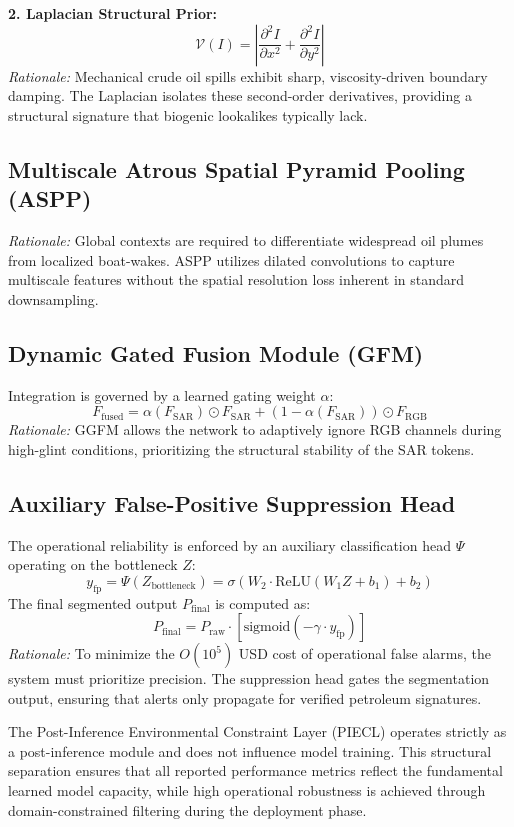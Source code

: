 \textbf{2. Laplacian Structural Prior:}
\begin{equation}
\mathcal{V}(I) = \left| \frac{\partial^2 I}{\partial x^2} + \frac{\partial^2 I}{\partial y^2} \right|
\end{equation}
\textit{Rationale:} Mechanical crude oil spills exhibit sharp, viscosity-driven boundary damping. The Laplacian isolates these second-order derivatives, providing a structural signature that biogenic lookalikes typically lack.

\subsection{Multiscale Atrous Spatial Pyramid Pooling (ASPP)}
\textit{Rationale:} Global contexts are required to differentiate widespread oil plumes from localized boat-wakes. ASPP utilizes dilated convolutions to capture multiscale features without the spatial resolution loss inherent in standard downsampling.

\subsection{Dynamic Gated Fusion Module (GFM)}
Integration is governed by a learned gating weight $\alpha$:
\begin{equation}
F_{\text{fused}} = \alpha(F_{\text{SAR}}) \odot F_{\text{SAR}} + (1 - \alpha(F_{\text{SAR}})) \odot F_{\text{RGB}}
\end{equation}
\textit{Rationale:} GGFM allows the network to adaptively ignore RGB channels during high-glint conditions, prioritizing the structural stability of the SAR tokens.

\subsection{Auxiliary False-Positive Suppression Head}
The operational reliability is enforced by an auxiliary classification head $\Psi$ operating on the bottleneck $Z$:
\begin{equation}
y_{\text{fp}} = \Psi(Z_{\text{bottleneck}}) = \sigma(W_2 \cdot \text{ReLU}(W_1 Z + b_1) + b_2)
\end{equation}
The final segmented output $P_{\text{final}}$ is computed as:
\begin{equation}
P_{\text{final}} = P_{\text{raw}} \cdot [ \text{sigmoid}(-\gamma \cdot y_{\text{fp}}) ]
\end{equation}
\textit{Rationale:} To minimize the $O(10^5)$ USD cost of operational false alarms, the system must prioritize precision. The suppression head gates the segmentation output, ensuring that alerts only propagate for verified petroleum signatures.

The Post-Inference Environmental Constraint Layer (PIECL) operates strictly as a post-inference module and does not influence model training. This structural separation ensures that all reported performance metrics reflect the fundamental learned model capacity, while high operational robustness is achieved through domain-constrained filtering during the deployment phase.
